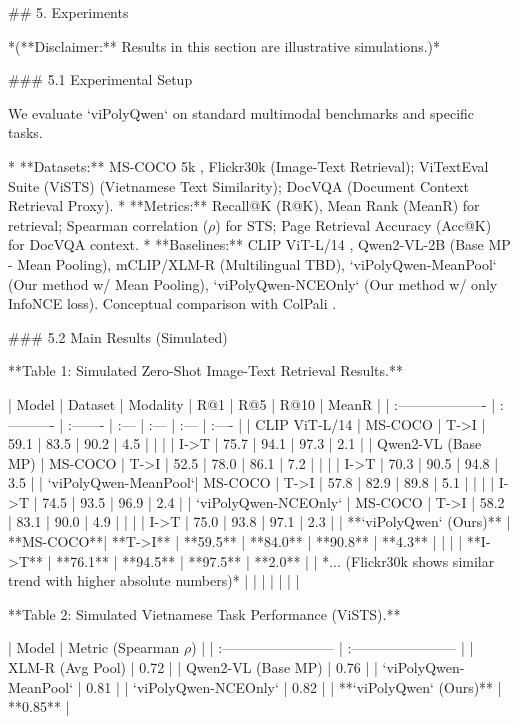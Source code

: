 ## 5. Experiments

*(**Disclaimer:** Results in this section are illustrative simulations.)*

### 5.1 Experimental Setup

We evaluate `viPolyQwen` on standard multimodal benchmarks and specific tasks.

*   **Datasets:** MS-COCO 5k \cite{lin2014microsoft}, Flickr30k \cite{young2014image} (Image-Text Retrieval); ViTextEval Suite (ViSTS) \cite{nguyen2023vietnamesests} (Vietnamese Text Similarity); DocVQA \cite{mathew2021docvqa} (Document Context Retrieval Proxy).
*   **Metrics:** Recall@K (R@K), Mean Rank (MeanR) for retrieval; Spearman correlation ($\rho$) for STS; Page Retrieval Accuracy (Acc@K) for DocVQA context.
*   **Baselines:** CLIP ViT-L/14 \cite{radford2021learning}, Qwen2-VL-2B (Base MP - Mean Pooling), mCLIP/XLM-R (Multilingual TBD), `viPolyQwen-MeanPool` (Our method w/ Mean Pooling), `viPolyQwen-NCEOnly` (Our method w/ only InfoNCE loss). Conceptual comparison with ColPali \cite{faysse2024colpali}.

### 5.2 Main Results (Simulated)

**Table 1: Simulated Zero-Shot Image-Text Retrieval Results.**

| Model                | Dataset     | Modality | R@1  | R@5  | R@10 | MeanR |
| :------------------- | :---------- | :------- | :--- | :--- | :--- | :---- |
| CLIP ViT-L/14        | MS-COCO     | T->I     | 59.1 | 83.5 | 90.2 | 4.5   |
|                      |             | I->T     | 75.7 | 94.1 | 97.3 | 2.1   |
| Qwen2-VL (Base MP)   | MS-COCO     | T->I     | 52.5 | 78.0 | 86.1 | 7.2   |
|                      |             | I->T     | 70.3 | 90.5 | 94.8 | 3.5   |
| `viPolyQwen-MeanPool`| MS-COCO     | T->I     | 57.8 | 82.9 | 89.8 | 5.1   |
|                      |             | I->T     | 74.5 | 93.5 | 96.9 | 2.4   |
| `viPolyQwen-NCEOnly` | MS-COCO     | T->I     | 58.2 | 83.1 | 90.0 | 4.9   |
|                      |             | I->T     | 75.0 | 93.8 | 97.1 | 2.3   |
| **`viPolyQwen` (Ours)** | **MS-COCO**| **T->I** | **59.5** | **84.0** | **90.8** | **4.3** |
|                      |             | **I->T** | **76.1** | **94.5** | **97.5** | **2.0** |
| *... (Flickr30k shows similar trend with higher absolute numbers)* | | | | | | |

**Table 2: Simulated Vietnamese Task Performance (ViSTS).**

| Model                     | Metric (Spearman $\rho$) |
| :------------------------ | :----------------------- |
| XLM-R (Avg Pool)          | 0.72                     |
| Qwen2-VL (Base MP)        | 0.76                     |
| `viPolyQwen-MeanPool`     | 0.81                     |
| `viPolyQwen-NCEOnly`      | 0.82                     |
| **`viPolyQwen` (Ours)**    | **0.85**                 |

